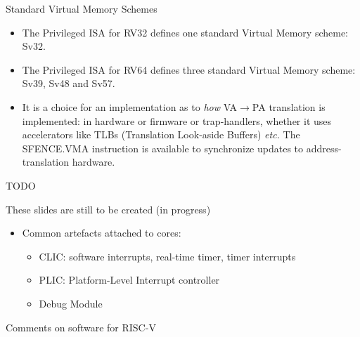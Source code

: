 \documentclass{article}
\newcommand{\etc}{\emph{etc.}}
\begin{document}
\clearpage


\begin{center}
  {\Huge
    Standard Virtual Memory Schemes}

  \vspace*{1in}

  \begin{minipage}[t]{9in}
    \begin{itemize}\Large
 
    \item The Privileged ISA for RV32 defines one standard Virtual Memory scheme: Sv32.

    \item The Privileged ISA for RV64 defines three standard Virtual
      Memory scheme: Sv39, Sv48 and Sv57.

    \item It is a choice for an implementation as to \emph{how}
      VA$\rightarrow$PA translation is implemented: in hardware or
      firmware or trap-handlers, whether it uses accelerators like
      TLBs (Translation Look-aside Buffers) {\etc} The SFENCE.VMA
      instruction is available to synchronize updates to
      address-translation hardware.

    \end{itemize}
  \end{minipage}
\end{center}

\clearpage


\begin{center}
  {\Huge
    TODO}

  \vspace*{0.5in}

  \begin{minipage}{9in}\LARGE
    These slides are still to be created (in progress)

    \vspace{0.5in}

    \begin{itemize}

    \item Common artefacts attached to cores:
      \begin{itemize}
      \item CLIC: software interrupts, real-time timer, timer interrupts
      \item PLIC: Platform-Level Interrupt controller
      \item Debug Module
      \end{itemize}
    \end{itemize}

    \item Comments on software for RISC-V
  \end{minipage}

\end{center}

\clearpage

\end{document}
